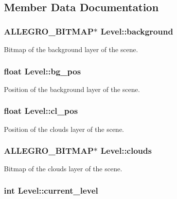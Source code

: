 \subsection{Member Data Documentation}
\hypertarget{structLevel_a4b4dd31284206502977b3d5b95d52abc}{
\subsubsection[{background}]{\setlength{\rightskip}{0pt plus 5cm}A\-L\-L\-E\-G\-R\-O\-\_\-\-B\-I\-T\-M\-A\-P$\ast$ Level\-::background}}\label{structLevel_a4b4dd31284206502977b3d5b95d52abc}
Bitmap of the background layer of the scene. \hypertarget{structLevel_a00321214fdc30f67615053d1ca614948}{
\subsubsection[{bg\-\_\-pos}]{\setlength{\rightskip}{0pt plus 5cm}float Level\-::bg\-\_\-pos}}\label{structLevel_a00321214fdc30f67615053d1ca614948}
Position of the background layer of the scene. \hypertarget{structLevel_af466533be369b5ce1f48196a7f3b7b0b}{
\subsubsection[{cl\-\_\-pos}]{\setlength{\rightskip}{0pt plus 5cm}float Level\-::cl\-\_\-pos}}\label{structLevel_af466533be369b5ce1f48196a7f3b7b0b}
Position of the clouds layer of the scene. \hypertarget{structLevel_a27d34b57b66d4e7f733cb6a5cc16ff18}{
\subsubsection[{clouds}]{\setlength{\rightskip}{0pt plus 5cm}A\-L\-L\-E\-G\-R\-O\-\_\-\-B\-I\-T\-M\-A\-P$\ast$ Level\-::clouds}}\label{structLevel_a27d34b57b66d4e7f733cb6a5cc16ff18}
Bitmap of the clouds layer of the scene. \hypertarget{structLevel_a1ba3ee0104c912dde5d6e70fee889512}{
\subsubsection[{current\-\_\-level}]{\setlength{\rightskip}{0pt plus 5cm}int Level\-::current\-\_\-level}}\label{structLevel_a1ba3ee0104c912dde5d6e70fee889512}
